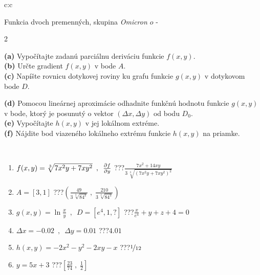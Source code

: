 \documentclass[10pt]{report}
\newcommand\omicron{o}
\begin{document}
\begin{tabular}{c:c}
\begin{minipage}[c][104.5mm][t]{0.5\linewidth}
\begin{center}
\vspace{7mm}
{\huge \LARGE Funkcia dvoch premenných, skupina \textit{Omicron $\omicron$} -}\\[5mm]
\begin{minipage}{0.95\linewidth}
\begin{center}
{\small \begin{multicols}{2} \raggedright
\textbf{(a)} Vypočítajte zadanú parciálnu deriváciu funkcie \(f(x,y)\). \\[1mm]
\textbf{(b)} Určte gradient \(f(x,y)\) v bode \(A\). \\[1mm]
\textbf{(c)} Napíšte rovnicu dotykovej roviny ku grafu funkcie \(g(x,y)\) v dotykovom bode \(D\). \par \columnbreak
\textbf{(d)} Pomocou lineárnej aproximácie odhadnite funkčnú hodnotu funkcie \(g(x,y)\) v bode, ktorý je posunutý o vektor \((\Delta x, \Delta y)\) od bodu \(D_0\). \\[1mm]
\textbf{(e)} Vypočítajte \(h(x,y)\) v jej lokálnom extréme. \\[1mm]
\textbf{(f)} Nájdite bod viazeného lokálneho extrému funkcie \(h(x,y)\) na priamke. \\[1mm]
\end{multicols}
}
\end{center}
\end{minipage}
\\[4mm]
\begin{minipage}{0.79\linewidth}
\begin{center}
\begin{varwidth}{\linewidth}
\begin{enumerate}
\normalsizerr
\item $f(x,y) = \sqrt[3]{7x^2y + 7xy^2}\enspace , \enspace \pdv{f}{y}$\quad \dotfill\; ???\;\dotfill \quad $\frac{7x^2+14xy}{3\,\sqrt[3]{(7x^2y+7xy^2)^{2}}}$
\item $A = [3, 1]$\quad \dotfill\; ???\;\dotfill \quad $\left( \frac{49}{3\,\sqrt[3]{84^2}} \;,\; \frac{210}{3\,\sqrt[3]{84^2}} \right)$
\item $g(x,y) = \ln\frac{x}{y} \enspace , \enspace D=[e^{4},1,?]$\quad \dotfill\; ???\;\dotfill \quad $\frac{x}{e^4} + y + z + 4 = 0$
\item $\Delta x = {-0.02} \enspace,\enspace \Delta y = {0.01}$\quad \dotfill\; ???\;\dotfill \quad $4.01$
\item $h(x,y) = -2x^2-y^2-2xy-x$\quad \dotfill\; ???\;\dotfill \quad $\nicefrac{1}{12}$
\item $y = 5x+3$\quad \dotfill\; ???\;\dotfill \quad $\left[\frac{23}{74}\;,\;\frac{1}{2}\right]$

\end{enumerate}
\end{varwidth}
\end{center}
\end{minipage}
\end{center}
\end{minipage}
\end{tabular}
\end{document}
